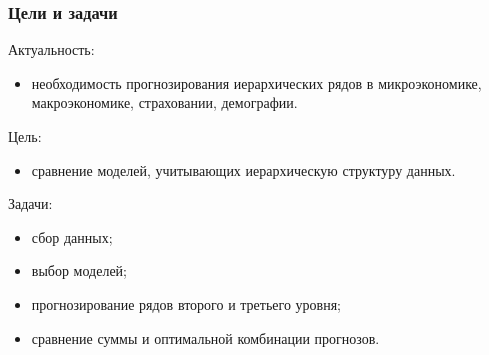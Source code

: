 \documentclass[c, dvipsnames]{beamer}  %
\begin{document}
\begin{frame}[shrink=3]
\frametitle{Цели и задачи} 


	\begin{block}{Актуальность:}
	\begin{itemize}
		
		\item  необходимость     прогнозирования иерархических рядов в микроэкономике,     макроэкономике, страховании, демографии.  
		
	\end{itemize}
\end{block}

	\begin{block}{Цель:}
	\begin{itemize}

		\item  сравнение моделей, учитывающих иерархическую структуру данных.
		
	\end{itemize}
		
	\end{block}

	\begin{block}{Задачи:}
	\begin{itemize}

\item  сбор данных;
\item  выбор моделей;
\item  прогнозирование рядов второго и третьего уровня;
\item  сравнение суммы и оптимальной комбинации прогнозов.


	\end{itemize}




	
\end{block}
\end{frame}
\end{document}
